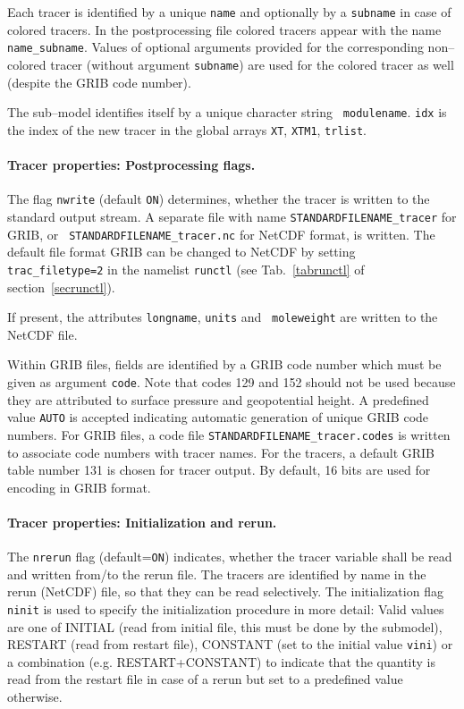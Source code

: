 Each tracer is identified by a unique {\tt name} and optionally by a
{\tt subname} in case of colored tracers. In the postprocessing file
colored tracers appear with the name {\tt name\_subname}. Values of
optional arguments provided for the corresponding non--colored tracer
(without argument {\tt subname}) are used for the colored tracer
as well (despite the GRIB code number).

The sub--model identifies itself by a unique character string {\tt
modulename}. {\tt idx} is the index of the new tracer in the global
arrays {\tt XT}, {\tt XTM1}, {\tt trlist}.

\paragraph{Tracer properties: Postprocessing flags.}

The flag {\tt nwrite} (default {\tt ON}) determines, whether the
tracer is written to the standard output stream. A separate file with
name {\tt STANDARDFILENAME\_tracer} for GRIB, or {\tt
STANDARDFILENAME\_tracer.nc} for NetCDF format, is written. The default
file format GRIB can be changed to NetCDF by setting {\tt
trac\_filetype=2} in the namelist {\tt runctl} (see
Tab.~\ref{tabrunctl} of section~\ref{secrunctl}).

If present, the attributes {\tt longname}, {\tt units} and {\tt
moleweight} are written to the NetCDF file.

Within GRIB files, fields are identified by a GRIB code number which
must be given as argument {\tt code}. Note that codes 129 and 152
should not be used because they are attributed to surface pressure and
geopotential height. A
predefined value {\tt AUTO} is accepted indicating automatic
generation of unique GRIB code numbers.  For GRIB files, a code file
{\tt STANDARDFILENAME\_tracer.codes} is written to associate code
numbers with tracer names.  For the tracers, a default GRIB table
number 131 is chosen for tracer output. By default, 16 bits are used
for encoding in GRIB format.
 
\paragraph{Tracer properties: Initialization and rerun.}

The {\tt nrerun} flag (default={\tt ON}) indicates, whether the tracer
variable shall be read and written from/to the rerun file. The tracers
are identified by name in the rerun (NetCDF) file, so that they can be
read selectively.  The initialization flag {\tt ninit} is used to
specify the initialization procedure in more detail: Valid values are
one of INITIAL (read from initial file, this must be done by the
submodel), RESTART (read from restart file), CONSTANT (set to the
initial value {\tt vini}) or a combination (e.g. RESTART+CONSTANT) to
indicate that the quantity is read from the restart file in case of a
rerun but set to a predefined value otherwise.

